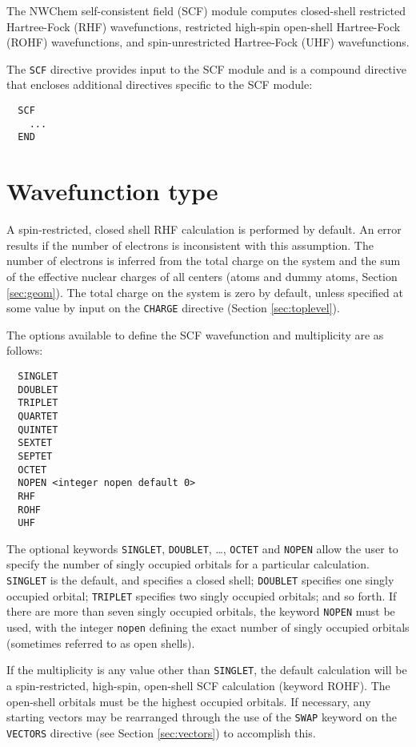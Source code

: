 \label{sec:scf}

The NWChem self-consistent field (SCF) module computes closed-shell
restricted Hartree-Fock (RHF) wavefunctions, restricted high-spin
open-shell Hartree-Fock (ROHF) wavefunctions, and spin-unrestricted
Hartree-Fock (UHF) wavefunctions.

The \verb+SCF+ directive provides input to the SCF module and is a
compound directive that encloses additional directives specific to the
SCF module:
\begin{verbatim}
  SCF
    ...
  END
\end{verbatim}

\section{Wavefunction type}

A spin-restricted, closed shell RHF calculation is performed by
default.  An error results if the number of electrons is inconsistent
with this assumption.  The number of electrons is inferred from the
total charge on the system and the sum of the effective nuclear
charges of all centers (atoms and dummy atoms, Section
\ref{sec:geom}).  The total charge on the system is zero by default,
unless specified at some value by input on the \verb+CHARGE+ directive
(Section \ref{sec:toplevel}).

The options available to define the SCF wavefunction and multiplicity
are as follows:

\begin{verbatim}
  SINGLET 
  DOUBLET 
  TRIPLET 
  QUARTET 
  QUINTET 
  SEXTET
  SEPTET
  OCTET
  NOPEN <integer nopen default 0>
  RHF
  ROHF
  UHF
\end{verbatim}

The optional keywords \verb+SINGLET+, \verb+DOUBLET+, \ldots,
\verb+OCTET+ and \verb+NOPEN+ allow the user to specify the number of
singly occupied orbitals for a particular calculation.  \verb+SINGLET+
is the default, and specifies a closed shell; \verb+DOUBLET+ specifies
one singly occupied orbital; \verb+TRIPLET+ specifies two singly
occupied orbitals; and so forth.  If there are more than seven singly
occupied orbitals, the keyword \verb+NOPEN+ must be used, with the
integer \verb+nopen+ defining the exact number of singly occupied
orbitals (sometimes referred to as open shells).

If the multiplicity is any value other than \verb+SINGLET+, the
default calculation will be a spin-restricted, high-spin, open-shell
SCF calculation (keyword ROHF).  The open-shell orbitals must be the
highest occupied orbitals.  If necessary, any starting vectors may be
rearranged through the use of the \verb+SWAP+ keyword on the
\verb+VECTORS+ directive (see Section \ref{sec:vectors}) to accomplish
this.

